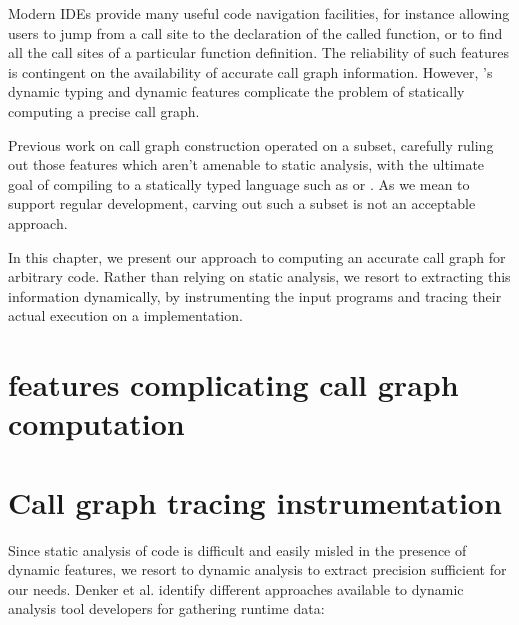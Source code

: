 Modern IDEs provide many useful code navigation facilities, for instance
allowing users to jump from a call site to the declaration of the called
function, or to find all the call sites of a particular function definition.
The reliability of such features is contingent on the availability of accurate
call graph information. However, \matlab's dynamic typing and dynamic features
complicate the problem of statically computing a precise call graph.

Previous work on \matlab call graph construction operated on a \matlab subset,
carefully ruling out those features which aren't amenable to static analysis,
with the ultimate goal of compiling \matlab to a statically typed language such
as \fortran or \xten \cite{Tamer}. As we mean to support regular \matlab
development, carving out such a subset is not an acceptable approach.

In this chapter, we present our approach to computing an accurate call graph
for arbitrary \matlab code. Rather than relying on static analysis, we resort
to extracting this information dynamically, by instrumenting the input programs
and tracing their actual execution on a \matlab implementation.

\section{\matlab features complicating call graph computation}

\section{Call graph tracing instrumentation}

Since static analysis of \matlab code is difficult and easily misled in the
presence of dynamic features, we resort to dynamic analysis to extract
precision sufficient for our needs. Denker et al.
\cite{AbstractionsForDynamicAnalysis} identify different approaches available
to dynamic analysis tool developers for gathering runtime data:

